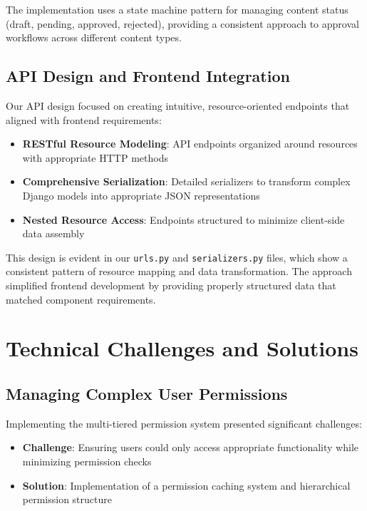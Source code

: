 The implementation uses a state machine pattern for managing content status (draft, pending, approved, rejected), providing a consistent approach to approval workflows across different content types.

\subsection{API Design and Frontend Integration}

Our API design focused on creating intuitive, resource-oriented endpoints that aligned with frontend requirements:

\begin{itemize}
    \item \textbf{RESTful Resource Modeling}: API endpoints organized around resources with appropriate HTTP methods
    \item \textbf{Comprehensive Serialization}: Detailed serializers to transform complex Django models into appropriate JSON representations
    \item \textbf{Nested Resource Access}: Endpoints structured to minimize client-side data assembly
\end{itemize}

This design is evident in our \texttt{urls.py} and \texttt{serializers.py} files, which show a consistent pattern of resource mapping and data transformation. The approach simplified frontend development by providing properly structured data that matched component requirements.

\section{Technical Challenges and Solutions}

\subsection{Managing Complex User Permissions}

Implementing the multi-tiered permission system presented significant challenges:

\begin{itemize}
    \item \textbf{Challenge}: Ensuring users could only access appropriate functionality while minimizing permission checks
    \item \textbf{Solution}: Implementation of a permission caching system and hierarchical permission structure
\end{itemize}


